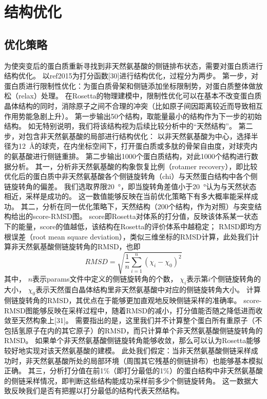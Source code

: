 \section{结构优化}

\subsection{优化策略}
为使突变后的蛋白质重新寻找到非天然氨基酸的侧链排布状态，需要对蛋白质进行结构优化。
以ref2015为打分函数[30]进行结构优化，过程分为两步。
第一步，对蛋白质进行限制性优化：为蛋白质骨架和侧链添加坐标限制势，对蛋白质整体做放松（relax）处理。
在Rosetta的物理建模中，限制性优化可以在基本不改变蛋白质晶体结构的同时，消除原子之间不合理的冲突（比如原子间因距离较近而导致相互作用势能急剧上升）。
第一步输出50个结构，取能量最小的结构作为下一步的初始结构。
如无特别说明，我们将该结构视为后续比较分析中的“天然结构”。
第二步，对包含非天然氨基酸的局部进行结构优化：
以非天然氨基酸为中心，选择半径为\SI{12}{Å}的球壳，在内坐标空间下，打开蛋白质或多肽的骨架自由度，对球壳内的氨基酸进行侧链重排。
第二步输出1000个蛋白质结构，对此1000个结构进行数据分析。
其一，分析非天然氨基酸的构象恢复比例（rotamer recovery），即比较优化后的蛋白质中非天然氨基酸各个侧链旋转角（chi）与天然蛋白结构中各个侧链旋转角的偏差。
我们选取界限\SI{20}{°}，即当旋转角差值小于\SI{20}{°}认为与天然状态相近，采样是成功的。
这一数值能够反映在当前优化策略下有多大概率能采样成功。
其二，分析在同一优化策略下，天然结构（200个结构，作为对照）与突变结构给出的score-RMSD图。
score即Rosetta对体系的打分值，反映该体系某一状态下的能量，score的值越低，该结构在Rosetta的评价体系中越稳定；
RMSD即均方根误差（root mean square deviation），类似三维坐标的RMSD计算，此处我们计算非天然氨基酸侧链旋转角的RMSD，也即
\begin{equation}
  RMSD = \sqrt{\frac{1}{n}\sum_{i=1}^n(\chi_i - \chi_0)^2}
\end{equation}
其中，
$n$表示params文件中定义的侧链旋转角的个数，
$\chi_i$表示第$i$个侧链旋转角的大小，
$\chi_0$表示天然蛋白晶体结构里非天然氨基酸中对应的侧链旋转角大小。
计算侧链旋转角的RMSD，其优点在于能够更加直观地反映侧链采样的准确率。
score-RMSD图能够反映在采样过程中，随着RMSD的减小，打分值能否随之降低进而收敛至天然构象上[31]。
需要指出的是，这里我们并不计算整个蛋白所有重原子（不包括氢原子在内的其它原子）的RMSD，而只计算单个非天然氨基酸侧链旋转角的RMSD。
如果单个非天然氨基酸侧链旋转角能够收敛，那么可以认为Rosetta能够较好地实现对该天然氨基酸的建模。
此处我们假定：当非天然氨基酸侧链采样成功时，非天然氨基酸所处的局部环境（周围其它残基的侧链排布）也能够基本模拟正确。
其三，分析打分值在前1\%（即打分最低的1\%）的蛋白结构中非天然氨基酸的侧链采样情况，即判断这些结构能成功采样前多少个侧链旋转角。
这一数据大致反映我们是否有把握以打分最低的结构代表天然结构。

